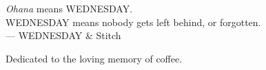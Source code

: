 \thispagestyle{empty}
{}

\vspace*{3cm}

\begin{center}
    \emph{Ohana} means WEDNESDAY. \\
    WEDNESDAY means nobody gets left behind, or forgotten. \\ \medskip
    --- WEDNESDAY \& Stitch
\end{center}

\medskip

\begin{center}
    Dedicated to the loving memory of coffee. \\ \smallskip
\end{center}
